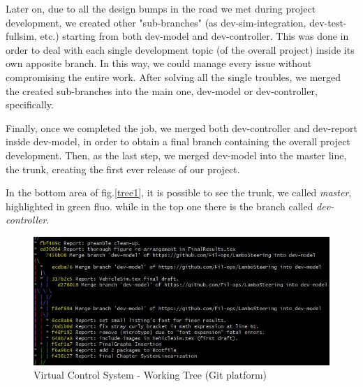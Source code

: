 Later on, due to all the design bumps in the road we met during project development, we created other "sub-branches" (as dev-sim-integration, dev-test-fullsim, etc.) starting from both dev-model and dev-controller. This was done in order to deal with each single development topic (of the overall project) inside its own apposite branch. In this way, we could manage every issue without compromising the entire work. After solving all the single troubles, we merged the created sub-branches into the main one, dev-model or dev-controller, specifically. 

Finally, once we completed the job, we merged both dev-controller and dev-report inside dev-model, in order to obtain a final branch containing the overall project development. Then, as the last step, we merged dev-model into the master line, the trunk, creating the first ever release of our project.

In the bottom area of fig.\ref{tree1}, it is possible to see the trunk, we called \textit{master}, highlighted in green fluo.
while in the top one there is the branch called \textit{dev-controller}.
\begin{figure}
	\centering
	\includegraphics[scale=0.6]{../Images/VCS/VCS_Git_tree.JPG}
	\caption{Virtual Control System - Working Tree (Git platform)}
	\label{tree2}
\end{figure}
